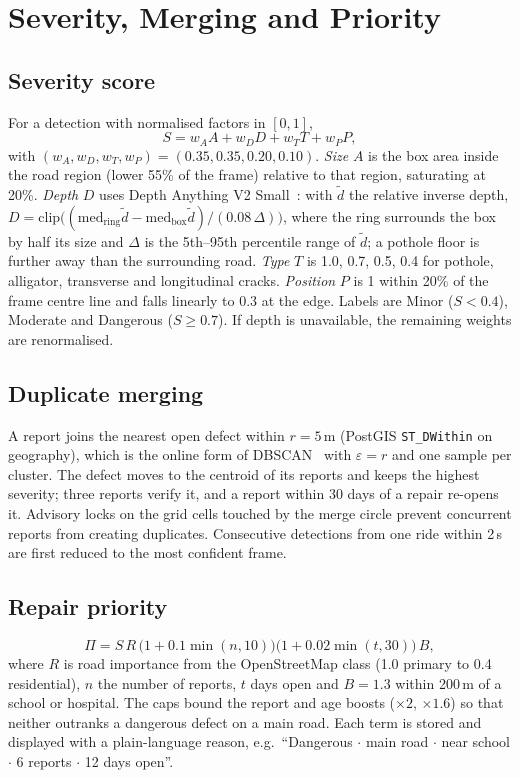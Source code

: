\documentclass[conference]{IEEEtran}
\begin{document}
\section{Severity, Merging and Priority}
\subsection{Severity score}\label{sec:sev}
For a detection with normalised factors in $[0,1]$,
\begin{equation}
S = w_A A + w_D D + w_T T + w_P P,
\end{equation}
with $(w_A, w_D, w_T, w_P) = (0.35, 0.35, 0.20, 0.10)$.
\emph{Size} $A$ is the box area inside the road region (lower 55\% of the frame) relative to that
region, saturating at 20\%. \emph{Depth} $D$ uses Depth Anything V2 Small~\cite{yang2024dav2}: with
$\tilde d$ the relative inverse depth, $D = \mathrm{clip}\big((\mathrm{med}_{\text{ring}}\tilde d -
\mathrm{med}_{\text{box}}\tilde d) / (0.08\,\Delta)\big)$, where the ring surrounds the box by half
its size and $\Delta$ is the 5th--95th percentile range of $\tilde d$; a pothole floor is further away
than the surrounding road. \emph{Type} $T$ is 1.0, 0.7, 0.5, 0.4 for pothole, alligator, transverse
and longitudinal cracks. \emph{Position} $P$ is 1 within 20\% of the frame centre line and falls
linearly to 0.3 at the edge. Labels are Minor ($S<0.4$), Moderate and Dangerous ($S\geq0.7$). If
depth is unavailable, the remaining weights are renormalised.

\subsection{Duplicate merging}\label{sec:merge}
A report joins the nearest open defect within $r=5$\,m (PostGIS \texttt{ST\_DWithin} on geography),
which is the online form of DBSCAN~\cite{ester1996dbscan} with $\varepsilon=r$ and one sample per
cluster. The defect moves to the centroid of its reports and keeps the highest severity; three
reports verify it, and a report within 30 days of a repair re-opens it. Advisory locks on the grid
cells touched by the merge circle prevent concurrent reports from creating duplicates. Consecutive
detections from one ride within 2\,s are first reduced to the most confident frame.

\subsection{Repair priority}\label{sec:prio}
\begin{equation}
\Pi = S\,R\,\big(1+0.1\min(n,10)\big)\big(1+0.02\min(t,30)\big)\,B,
\end{equation}
where $R$ is road importance from the OpenStreetMap class (1.0 primary to 0.4 residential), $n$ the
number of reports, $t$ days open and $B=1.3$ within 200\,m of a school or hospital. The caps bound the
report and age boosts ($\times2$, $\times1.6$) so that neither outranks a dangerous defect on a main
road. Each term is stored and displayed with a plain-language reason, e.g.\ ``Dangerous $\cdot$ main
road $\cdot$ near school $\cdot$ 6 reports $\cdot$ 12 days open''.
\end{document}
